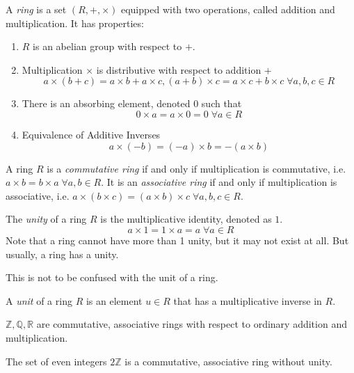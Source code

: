 \documentclass{article}
\begin{document}
\begin{definition}
  A \textit{ring} is a set $(R, +, \times)$ equipped with two operations, called addition and multiplication. It has properties: 
  \begin{enumerate}
    \item $R$ is an abelian group with respect to $+$.
    \item Multiplication $\times$ is distributive with respect to addition $+$
    \[a \times (b + c) = a\times b + a\times c, (a+b)\times c = a\times c + b\times c \; \forall a, b, c \in R\]
    \item There is an absorbing element, denoted $0$ such that 
    \[ 0\times a = a\times 0 = 0 \; \forall a \in R \]
    \item Equivalence of Additive Inverses
    \[ a \times (-b) = (-a) \times b = - (a\times b) \]
  \end{enumerate}
\end{definition}

\begin{definition}
  A ring $R$ is a \textit{commutative ring} if and only if multiplication is commutative, i.e. $a\times b = b \times a \; \forall a, b \in R$. It is an \textit{associative ring} if and only if multiplication is associative, i.e. $a \times (b \times c) = (a \times b) \times c \; \forall a, b, c \in R$.
\end{definition}

\begin{definition}
  The \textit{unity} of a ring $R$ is the multiplicative identity, denoted as $1$. 
  \[a \times 1 = 1 \times a = a \; \forall a \in R \]
  Note that a ring cannot have more than 1 unity, but it may not exist at all. But usually, a ring has a unity.
\end{definition}

This is not to be confused with the unit of a ring. 

\begin{definition}
  A \textit{unit} of a ring $R$ is an element $u \in R$ that has a multiplicative inverse in $R$. 
\end{definition}

\begin{example}
  $\mathbb{Z}, \mathbb{Q}, \mathbb{R}$ are commutative, associative rings with respect to ordinary addition and multiplication.
\end{example}

\begin{example}
  The set of even integers $2\mathbb{Z}$ is a commutative, associative ring without unity.
\end{example}
\end{document}
